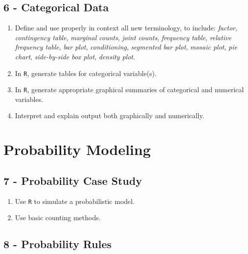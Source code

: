 \documentclass[
  letterpaper,
  DIV=11,
  numbers=noendperiod]{scrreprt}
\begin{document}
\subsection*{6 - Categorical Data}\label{categorical-data}

\begin{enumerate}
\def\labelenumi{\arabic{enumi})}
\item
  Define and use properly in context all new terminology, to include:
  \emph{factor}, \emph{contingency table}, \emph{marginal counts},
  \emph{joint counts}, \emph{frequency table}, \emph{relative frequency
  table}, \emph{bar plot}, \emph{conditioning}, \emph{segmented bar
  plot}, \emph{mosaic plot}, \emph{pie chart}, \emph{side-by-side box
  plot}, \emph{density plot}.
\item
  In \texttt{R}, generate tables for categorical variable(s).
\item
  In \texttt{R}, generate appropriate graphical summaries of categorical
  and numerical variables.
\item
  Interpret and explain output both graphically and numerically.
\end{enumerate}

\section*{Probability Modeling}\label{probability-modeling}


\subsection*{7 - Probability Case Study}\label{probability-case-study}

\begin{enumerate}
\def\labelenumi{\arabic{enumi})}
\item
  Use \texttt{R} to simulate a probabilistic model.
\item
  Use basic counting methods.
\end{enumerate}

\subsection*{8 - Probability Rules}\label{probability-rules}
\end{document}
